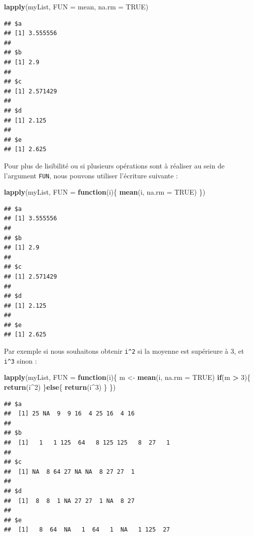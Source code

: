 \documentclass[
]{book}
\newenvironment{Shaded}{\begin{snugshade}}{\end{snugshade}}
\newcommand{\ControlFlowTok}[1]{\textcolor[rgb]{0.13,0.29,0.53}{\textbf{#1}}}
\newcommand{\DataTypeTok}[1]{\textcolor[rgb]{0.13,0.29,0.53}{#1}}
\newcommand{\DecValTok}[1]{\textcolor[rgb]{0.00,0.00,0.81}{#1}}
\newcommand{\KeywordTok}[1]{\textcolor[rgb]{0.13,0.29,0.53}{\textbf{#1}}}
\newcommand{\NormalTok}[1]{#1}
\newcommand{\OperatorTok}[1]{\textcolor[rgb]{0.81,0.36,0.00}{\textbf{#1}}}
\newcommand{\OtherTok}[1]{\textcolor[rgb]{0.56,0.35,0.01}{#1}}
\newcommand{\StringTok}[1]{\textcolor[rgb]{0.31,0.60,0.02}{#1}}
\begin{document}
\begin{Shaded}
\begin{Highlighting}[]
\KeywordTok{lapply}\NormalTok{(myList, }\DataTypeTok{FUN =}\NormalTok{ mean, }\DataTypeTok{na.rm =} \OtherTok{TRUE}\NormalTok{)}
\end{Highlighting}
\end{Shaded}

\begin{verbatim}
## $a
## [1] 3.555556
## 
## $b
## [1] 2.9
## 
## $c
## [1] 2.571429
## 
## $d
## [1] 2.125
## 
## $e
## [1] 2.625
\end{verbatim}

Pour plus de lisibilité ou si plusieurs opérations sont à réaliser au sein de l'argument \texttt{FUN}, nous pouvons utiliser l'écriture suivante :

\begin{Shaded}
\begin{Highlighting}[]
\KeywordTok{lapply}\NormalTok{(myList, }\DataTypeTok{FUN =} \ControlFlowTok{function}\NormalTok{(i)\{}
  \KeywordTok{mean}\NormalTok{(i, }\DataTypeTok{na.rm =} \OtherTok{TRUE}\NormalTok{)}
\NormalTok{\})}
\end{Highlighting}
\end{Shaded}

\begin{verbatim}
## $a
## [1] 3.555556
## 
## $b
## [1] 2.9
## 
## $c
## [1] 2.571429
## 
## $d
## [1] 2.125
## 
## $e
## [1] 2.625
\end{verbatim}

Par exemple si nous souhaitons obtenir \texttt{i\^{}2} si la moyenne est supérieure à 3, et \texttt{i\^{}3} sinon :

\begin{Shaded}
\begin{Highlighting}[]
\KeywordTok{lapply}\NormalTok{(myList, }\DataTypeTok{FUN =} \ControlFlowTok{function}\NormalTok{(i)\{}
\NormalTok{  m <-}\StringTok{ }\KeywordTok{mean}\NormalTok{(i, }\DataTypeTok{na.rm =} \OtherTok{TRUE}\NormalTok{)}
  \ControlFlowTok{if}\NormalTok{(m }\OperatorTok{>}\StringTok{ }\DecValTok{3}\NormalTok{)\{}
    \KeywordTok{return}\NormalTok{(i}\OperatorTok{^}\DecValTok{2}\NormalTok{)  }
\NormalTok{  \}}\ControlFlowTok{else}\NormalTok{\{}
    \KeywordTok{return}\NormalTok{(i}\OperatorTok{^}\DecValTok{3}\NormalTok{)}
\NormalTok{  \}}
\NormalTok{\})}
\end{Highlighting}
\end{Shaded}

\begin{verbatim}
## $a
##  [1] 25 NA  9  9 16  4 25 16  4 16
## 
## $b
##  [1]   1   1 125  64   8 125 125   8  27   1
## 
## $c
##  [1] NA  8 64 27 NA NA  8 27 27  1
## 
## $d
##  [1]  8  8  1 NA 27 27  1 NA  8 27
## 
## $e
##  [1]   8  64  NA   1  64   1  NA   1 125  27
\end{verbatim}
\end{document}
